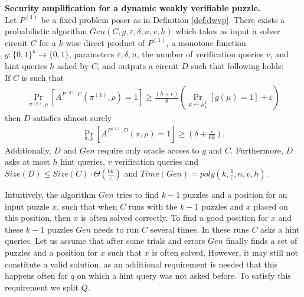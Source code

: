 \begin{theorem}{\textbf{Security amplification for a dynamic weakly verifiable puzzle.}}
\label{th:sec_amp_for_dwvp}\\
Let $P^{(1)}$ be a fixed problem poser as in Definition \ref{def:dwvp}. There exists a probabilistic
algorithm $Gen(C, g, \varepsilon, \delta, n, v, h)$ which takes as input a solver circuit $C$ for a $k$-wise
direct product of $P^{(1)}$, a monotone function $g:\{0,1\}^k \rightarrow \{0,1\}$, parameters $\varepsilon, \delta,n$,
the number of verification queries $v$, and hint queries $h$ asked by $C$, and outputs a circuit $D$
such that following holds: \\
If $C$ is such that \\
  \begin{align*}
    \underset{\pi^{(k)}, \rho}{\Pr}[A^{P^{(g)}, C}(\pi^{(k)}, \rho) = 1]
    \geq \frac{(h+v)}{8} \left(\underset{\mu \leftarrow \mu_\delta^k}{\Pr}[g(\mu) = 1] + \varepsilon\right)
  \end{align*}
then $D$ satisfies almost surely
  \begin{align*}
    \underset{\pi, \rho}{\Pr}[A^{P^{(1)},D}(\pi, \rho) = 1] \geq (\delta + \frac{\varepsilon}{6k}).
  \end{align*}
Additionally, $D$ and $Gen$ require only oracle access to $g$ and $C$. Furthermore, $D$ asks at most $h$ hint queries, $v$ verification queries and
$Size(D) \leq Size(C) \cdot \Theta(\frac{6k}{\varepsilon})$ and $Time(Gen) = poly(k, \frac{1}{\varepsilon}, n, v, h)$.
\end{theorem}
%
%
Intuitively, the algorithm $Gen$ tries to find $k-1$ puzzles and a position for an input puzzle $x$, such that
when $C$ runs with the $k-1$ puzzles and $x$ placed on this position, then $x$ is often solved correctly.
To find a good position for $x$ and these $k-1$ puzzles $Gen$ needs to run $C$ several times.
In these runs $C$ asks a hint queries.
Let us assume that after some trials and errors $Gen$ finally finds a set of puzzles and a position for $x$ such that $x$ is often solved.
However, it may still not constitute a valid solution, as an additional requirement is needed that this happens often for $q$
on which a hint query was not asked before. To satisfy this requirement we split $Q$.
